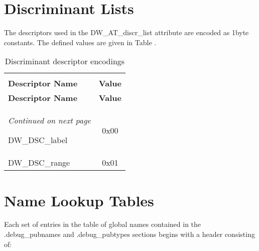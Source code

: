\section{Discriminant Lists}
\label{datarep:discriminantlists}

The descriptors used in the 
DW\_AT\_discr\_list attribute are 
encoded as 1\dash byte constants. The
defined values are given in 
Table .

\begin{centering}
\setlength{\extrarowheight}{0.1cm}
\begin{longtable}{l|c}
  \caption{Discriminant descriptor encodings} \label{tab:discriminantdescriptorencodings}\\
  \hline \\ \bfseries Descriptor Name&\bfseries Value \\ \hline
\endfirsthead
  \bfseries Descriptor Name&\bfseries Value\\ \hline
\endhead
  \hline \emph{Continued on next page}
\endfoot
  \hline
\endlastfoot

DW\_DSC\_label&0x00 \\
DW\_DSC\_range&0x01 \\

\end{longtable}
\end{centering}

\section{Name Lookup Tables}
\label{datarep:namelookuptables}

Each set of entries in the table of global names contained
in the .debug\_pubnames and .debug\_pubtypes sections begins
with a header consisting of:


